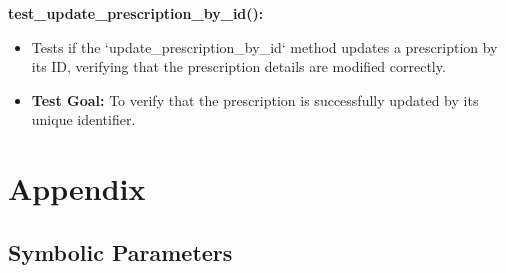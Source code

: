 \documentclass[12pt, titlepage]{article}
\begin{document}
\begin{enumerate}
\begin{enumerate}
\begin{enumerate}
\textbf{test\_update\_prescription\_by\_id():}  
\begin{itemize}
    \item Tests if the `update\_prescription\_by\_id` method updates a prescription by its ID, verifying that the prescription details are modified correctly.
    \item \textbf{Test Goal:} To verify that the prescription is successfully updated by its unique identifier.
    \newline
\end{itemize}







\newpage




\newpage

\section{Appendix}

\subsection{Symbolic Parameters}
\renewcommand{\arraystretch}{1.3}


\end{enumerate}
\end{enumerate}
\end{enumerate}
\end{document}
